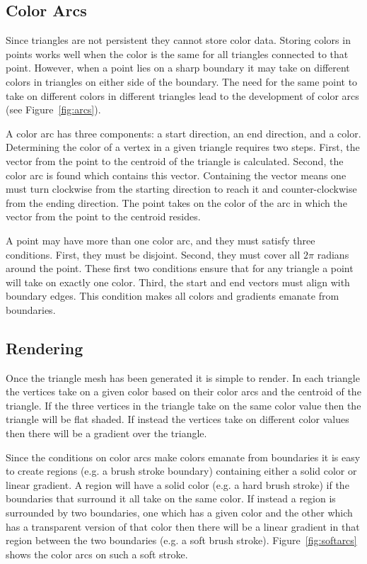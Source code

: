 \documentclass[conference]{acmsiggraph}
\begin{document}
\subsection{Color Arcs}
Since triangles are not persistent they cannot store color data.
Storing colors in points works well when the color is the same for all triangles connected
to that point. However, when a point lies on a sharp boundary it may take on different colors in
triangles on either side of the boundary. The need for the same point to take on different
colors in different triangles lead to the development of color arcs (see Figure~\ref{fig:arcs}).

A color arc has three components: a start direction, an end direction, and a color. 
Determining the color of a vertex in a given triangle requires two steps. First,
the vector from the point to the centroid of the triangle is calculated. Second,
the color arc is found which contains this vector. Containing the vector means one must turn
clockwise from the starting direction to reach it and counter-clockwise from the ending direction.
The point takes on the color of the arc in which the vector from the point to the centroid resides.

A point may have more than one color arc, and they must satisfy three conditions. First, they must be disjoint. Second,
they must cover all $2\pi$ radians around the point. These first two conditions ensure that for any
triangle a point will take on exactly one color. Third, the start and end vectors must align
with boundary edges. This condition makes all colors and gradients emanate from boundaries.

\subsection{Rendering}
Once the triangle mesh has been generated it is simple to render. In each triangle the vertices
take on a given color based on their color arcs and the centroid of the triangle. If the three
vertices in the triangle take on the same color value then the triangle will be flat shaded. If instead the 
vertices take on different color values then there will be a gradient over the triangle.

Since the conditions on color arcs make colors emanate from boundaries it is easy to create regions (e.g. a brush stroke boundary)
containing either a solid color or linear gradient. A region will have a solid color (e.g. a hard brush stroke) if the
boundaries that surround it all take on the same color. If instead a region is surrounded by
two boundaries, one which has a given color and the other which has a transparent version of that color
then there will be a linear gradient in that region between the two boundaries (e.g. a soft brush stroke).
Figure~\ref{fig:softarcs} shows the color arcs on such a soft stroke.
\end{document}
